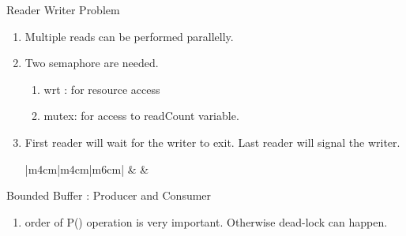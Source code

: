 \begin{enumerate}
  \item Reader Writer Problem
  \begin{enumerate}
    \item Multiple reads can be performed parallelly.
    \item Two semaphore are needed.
      \begin{enumerate}
        \item wrt : for resource access
        \item mutex: for access to readCount variable.
      \end{enumerate}
      \item First reader will wait for the writer to exit. Last reader will signal the writer. \\
      \begin{myTableStyle}
        \begin{tabular}{ |m{4cm}|m{4cm}|m{6cm}| } \hline
               &
               &
             \\ \hline
        \end{tabular}
      \end{myTableStyle}
  \end{enumerate}

 \begin{minipage}{\linewidth}
  \item Bounded Buffer : Producer and Consumer
    \begin{enumerate}
      \item order of P() operation is very important. Otherwise dead-lock can happen.
    \end{enumerate}
      \begin{myTableStyle}
        \begin{tabular}{ |m{4.5cm}|m{5cm}| } \hline
               &
              \\ \hline
        \end{tabular}
      \end{myTableStyle}
      \vspace{0.08in}
  \end{minipage}
  \vspace{0.08in}


\end{enumerate}
